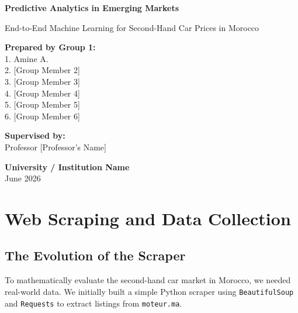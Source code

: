 \documentclass[12pt]{report}
\begin{document}
\begin{titlepage}
    \centering
    \vspace*{2cm}
    
    \Huge
    \textbf{Predictive Analytics in Emerging Markets}
    
    \vspace{0.5cm}
    \LARGE
    End-to-End Machine Learning for Second-Hand Car Prices in Morocco
    
    \vspace{2cm}
    
    \large
    \textbf{Prepared by Group 1:} \\
    \vspace{0.2cm}
    \normalsize
    1. Amine A. \\
    2. [Group Member 2] \\
    3. [Group Member 3] \\
    4. [Group Member 4] \\
    5. [Group Member 5] \\
    6. [Group Member 6] \\
    
    \vspace{2cm}
    
    \large
    \textbf{Supervised by:} \\
    Professor [Professor's Name]
    
    \vfill
    
    \large
    \textbf{University / Institution Name} \\
    \vspace{0.2cm}
    June 2026
\end{titlepage}

\onehalfspacing
\tableofcontents
\newpage

\chapter{Web Scraping and Data Collection}

\section{The Evolution of the Scraper}
To mathematically evaluate the second-hand car market in Morocco, we needed real-world data. We initially built a simple Python scraper using \texttt{BeautifulSoup} and \texttt{Requests} to extract listings from \texttt{moteur.ma}. 
\end{document}
